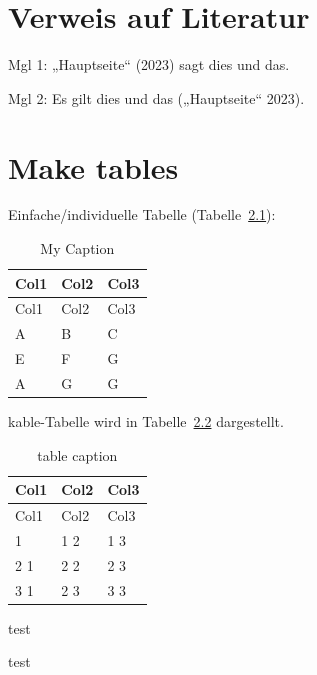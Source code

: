 \documentclass[
  11pt,
]{scrbook}
\begin{document}
\hypertarget{verweis-auf-literatur}{%
\chapter{Verweis auf Literatur}\label{verweis-auf-literatur}}

Mgl 1: {„Hauptseite``} (2023) sagt dies und das.

Mgl 2: Es gilt dies und das ({„Hauptseite``} 2023).

\hypertarget{make-tables}{%
\chapter{Make tables}\label{make-tables}}

Einfache/individuelle Tabelle (Tabelle~\ref{tbl-letters}):

\hypertarget{tbl-letters}{}
\begin{longtable}[]{@{}lll@{}}
\caption{\label{tbl-letters}My Caption}\tabularnewline
\toprule\noalign{}
Col1 & Col2 & Col3 \\
\midrule\noalign{}
\endfirsthead
\toprule\noalign{}
Col1 & Col2 & Col3 \\
\midrule\noalign{}
\endhead
\bottomrule\noalign{}
\endlastfoot
A & B & C \\
E & F & G \\
A & G & G \\
\end{longtable}

\newpage{}

kable-Tabelle wird in Tabelle~\ref{tbl-example_table} dargestellt.

\hypertarget{tbl-example_table}{}
\begin{longtable}[]{@{}lll@{}}
\caption{\label{tbl-example_table}table caption}\tabularnewline
\toprule\noalign{}
Col1 & Col2 & Col3 \\
\midrule\noalign{}
\endfirsthead
\toprule\noalign{}
Col1 & Col2 & Col3 \\
\midrule\noalign{}
\endhead
\bottomrule\noalign{}
\endlastfoot
1 1 & 1 2 & 1 3 \\
2 1 & 2 2 & 2 3 \\
3 1 & 2 3 & 3 3 \\
\end{longtable}

\newpage{}

test

\newpage{}

test

\newpage{}
\end{document}
